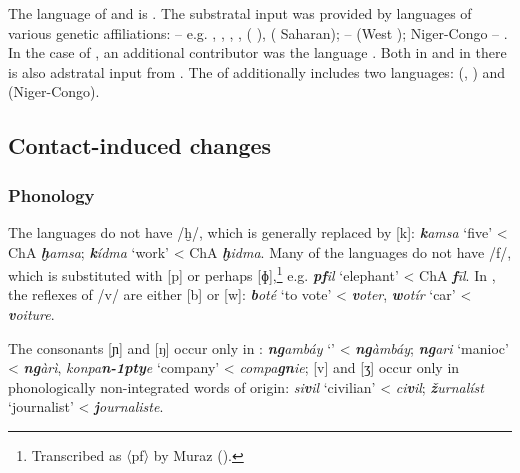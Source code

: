 \documentclass[output=paper]{langsci/langscibook}
\begin{document}
The  language of  and   is   . The substratal input was provided by languages of various genetic affiliations:  – e.g. , , , ,  ( ),  ( Saharan);  –  (West ); Niger-Congo – . In the case of , an additional contributor was the  language . Both in  and in   there is also adstratal input from . The  of   additionally includes two languages:  (,  ) and  (Niger-Congo).


 
 \subsection{Contact-induced changes}
 \subsubsection{Phonology}

The  languages do not have /ḫ/, which is generally replaced by [k]:  \textbf{\textit{k}}\textit{amsa} ‘five’ < ChA \textbf{\textit{ḫ}}\textit{amsa};   \textbf{\textit{k}}\textit{ídma} ‘work’ < ChA \textbf{\textit{ḫ}}\textit{idma}. Many of the  languages do not have /f/, which is substituted with [p] or perhaps [ɸ],\footnote{Transcribed as 〈pf〉 by Muraz (\citeyear[168]{Muraz1926}).} e.g.  \textit{\textbf{pf}il} ‘elephant’ < ChA \textit{\textbf{f}īl}. In  , the reflexes of /v/ are either [b] or [w]:   \textit{\textbf{b}oté} ‘to vote’ <  \textit{\textbf{v}oter}, \textit{\textbf{w}otír} ‘car’ <  \textit{\textbf{v}oiture}.  

  The consonants [ɲ] and [ŋ] occur only in :   \textit{\textbf{ng}ambáy} ‘’ <  \textit{\textbf{ng}àmbáy};  \textit{\textbf{ng}ari} ‘manioc’ <  \textit{\textbf{ng}àrì}, \textit{konpa}\textit{\textbf{n\kern -1pty}e} ‘company’ <  \textit{compa}\textit{\textbf{gn}ie}; [v] and [ʒ] occur only in phonologically non-integrated words of  origin:  \textit{si}\textit{\textbf{v}il} ‘civilian’ <  \textit{ci}\textit{\textbf{v}il};   \textit{\textbf{ž}urnalíst} `journalist' <  \textit{\textbf{j}ournaliste}. 
\end{document}
